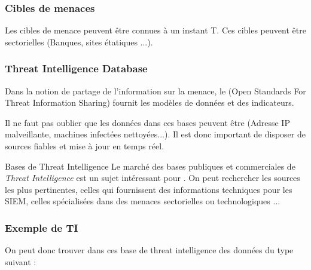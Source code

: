 \subsubsection{Cibles de menaces}

Les cibles de menace peuvent être connues à un instant T. Ces cibles peuvent être  sectorielles (Banques, sites étatiques ...).


\subsubsection{Threat Intelligence Database }

Dans la notion de partage de l'information sur la menace, le  (Open Standards For Threat Information Sharing) fournit les modèles de données et des indicateurs.

Il ne faut pas oublier que les données dans ces bases peuvent être  (Adresse IP malveillante, machines infectées nettoyées...). Il est donc important de disposer de sources fiables et mise à jour en temps réel.

\begin{techworkbox}{Bases de Threat Intelligence}
Le marché des bases publiques et commerciales de \textit{Threat Intelligence} est un sujet intéressant pour \fichetech. On peut rechercher les sources les plus pertinentes, celles qui fournissent des informations techniques pour les SIEM, celles spécialisées dans des menaces sectorielles ou technologiques ...
\end{techworkbox}


\subsubsection{Exemple de TI}

On peut donc trouver dans ces base de threat intelligence des données du type suivant  :

